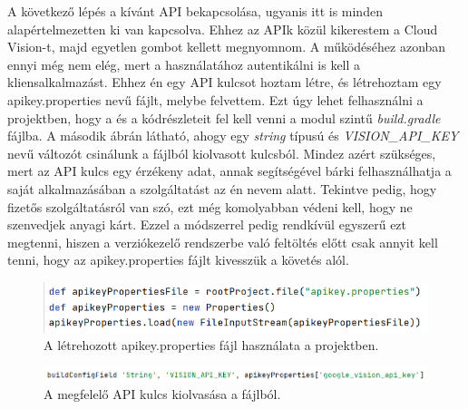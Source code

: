 A következő lépés a kívánt API bekapcsolása, ugyanis itt is minden alapértelmezetten ki van kapcsolva. Ehhez az APIk közül kikerestem a Cloud Vision-t, majd egyetlen gombot kellett megnyomnom. A működéséhez azonban ennyi még nem elég, mert a használatához autentikálni is kell a kliensalkalmazást. Ehhez én egy API kulcsot hoztam létre, és létrehoztam egy apikey.properties nevű fájlt, melybe felvettem. Ezt úgy lehet felhasználni a projektben, hogy a  és a  kódrészleteit fel kell venni a modul szintű \emph{build.gradle} fájlba. A második ábrán látható, ahogy egy \emph{string} típusú és \emph{VISION\_API\_KEY} nevű változót csinálunk a fájlból kiolvasott kulcsból. Mindez azért szükséges, mert az API kulcs egy érzékeny adat, annak segítségével bárki felhasználhatja a saját alkalmazásában a szolgáltatást az én nevem alatt. Tekintve pedig, hogy fizetős szolgáltatásról van szó, ezt még komolyabban védeni kell, hogy ne szenvedjek anyagi kárt. Ezzel a módszerrel pedig rendkívül egyszerű ezt megtenni, hiszen a verziókezelő rendszerbe való feltöltés előtt csak annyit kell tenni, hogy az apikey.properties fájlt kivesszük a követés alól.

\begin{figure}[!ht]
	\centering
	\includegraphics[width=120mm, keepaspectratio]{figures/gradle_apikey.png}
	\caption{A létrehozott apikey.properties fájl használata a projektben.}
	\label{fig:ApiKey}
\end{figure}

\begin{figure}[!ht]
	\centering
	\includegraphics[width=130mm, keepaspectratio]{figures/apikey_configfield.png}
	\caption{A megfelelő API kulcs kiolvasása a fájlból.}
	\label{fig:ApiKeyConfig}
\end{figure}

